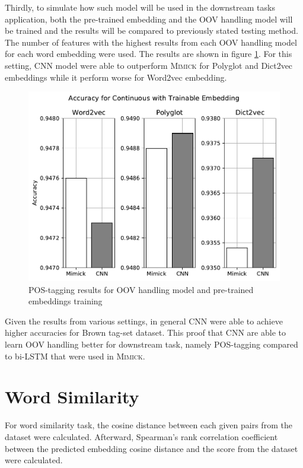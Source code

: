       Thirdly, to simulate how such model will be used in the
      downstream tasks application, both the pre-trained embedding and
      the OOV handling model will be trained and the results will be compared
      to previously stated testing method. The number of features with
      the highest results from each OOV handling model for each word embedding
      were used. The results are shown in figure
      \ref{fig:postag_train_embed_results}. For this setting, CNN
      model were able to outperform \textsc{Mimick} for Polyglot and
      Dict2vec embeddings while it perform worse for Word2vec embedding.
      \begin{figure}[H]
        \centering
        \includegraphics[width=0.8\linewidth]{images/train_embed.pdf}
        \caption{POS-tagging results for OOV handling model and pre-trained embeddings training}
        \label{fig:postag_train_embed_results}
      \end{figure}
      
      Given the results from various settings, in general CNN were
      able to achieve higher accuracies for Brown tag-set dataset.
      This proof that CNN are able to learn OOV handling better for
      downstream task, namely POS-tagging compared to bi-LSTM that
      were used in \textsc{Mimick}.

    \section{Word Similarity}
    For word similarity task, the cosine distance between each given
    pairs from the dataset were calculated. Afterward, Spearman's rank
    correlation coefficient between the predicted embedding cosine
    distance and the score from the dataset were calculated.

